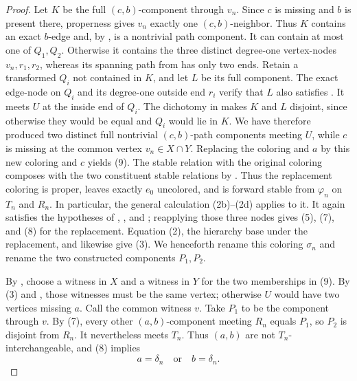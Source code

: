 \begin{proof}
Let $K$ be the full $(c,b)$-component through $v_n$.  Since $c$ is
missing and $b$ is present there, properness gives $v_n$ exactly one
$(c,b)$-neighbor.  Thus $K$ contains an exact $b$-edge and, by
, is a nontrivial path component.  It can
contain at most one of $Q_1,Q_2$.  Otherwise it contains the three
distinct degree-one vertex-nodes $v_n,r_1,r_2$, whereas its spanning path
from  has only two ends.  Retain a
transformed $Q_i$ not contained in $K$, and let $L$ be its full component.
The exact edge-node on $Q_i$ and its degree-one outside end $r_i$ verify
that $L$ also satisfies .  It meets $U$ at
the inside end of $Q_i$.  The dichotomy in
 makes $K$ and $L$ disjoint, since
otherwise they would be equal and $Q_i$ would lie in $K$.  We have
therefore produced two distinct full nontrivial $(c,b)$-path components
meeting $U$, while $c$ is missing at the common vertex
$v_n\in X\cap Y$.  Replacing the coloring and $a$ by this new coloring
and $c$ yields (9).  The stable relation with the original coloring composes with the two
constituent stable relations by .  Thus the replacement
coloring is proper, leaves exactly $e_0$ uncolored, and is forward stable
from $\varphi_n$ on $T_n$ and $R_n$.  In particular, the general
calculation (2b)--(2d) applies to it.  It again satisfies the hypotheses of
,
, and
; reapplying those three nodes
gives (5), (7), and (8) for the replacement.  Equation (2), the
hierarchy base under the replacement, and
 likewise give (3).  We
henceforth rename this coloring $\sigma_n$ and rename the two
constructed components $P_1,P_2$.

By , choose a witness in $X$ and a witness in
$Y$ for the two memberships in (9).  By (3) and
, those witnesses must be the same
vertex; otherwise $U$ would have two vertices missing $a$.  Call the
common witness $v$.
Take $P_1$ to be the component through $v$.  By (7), every other
$(a,b)$-component meeting $R_n$ equals $P_1$, so $P_2$ is disjoint
from $R_n$.  It nevertheless meets $T_n$.  Thus $(a,b)$ are not
$T_n$-interchangeable, and (8) implies
\[
                         a=\delta_n\quad\text{or}\quad
                         b=\delta_n.                           \tag{10}
\]


\end{proof}
